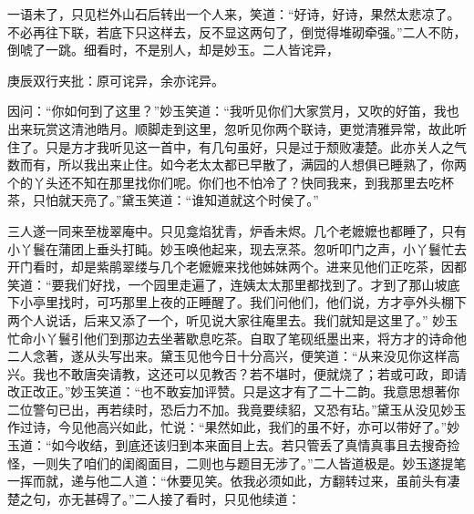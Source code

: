 \begin{parag}
    一语未了，只见栏外山石后转出一个人来，笑道：“好诗，好诗，果然太悲凉了。不必再往下联，若底下只这样去，反不显这两句了，倒觉得堆砌牵强。”二人不防，倒唬了一跳。细看时，不是别人，却是妙玉。二人皆诧异，\begin{note}庚辰双行夹批：原可诧异，余亦诧异。\end{note}因问：“你如何到了这里？”妙玉笑道：“我听见你们大家赏月，又吹的好笛，我也出来玩赏这清池皓月。顺脚走到这里，忽听见你两个联诗，更觉清雅异常，故此听住了。只是方才我听见这一首中，有几句虽好，只是过于颓败凄楚。此亦关人之气数而有，所以我出来止住。如今老太太都已早散了，满园的人想俱已睡熟了，你两个的丫头还不知在那里找你们呢。你们也不怕冷了？快同我来，到我那里去吃杯茶，只怕就天亮了。”黛玉笑道：“谁知道就这个时侯了。”
\end{parag}


\begin{parag}
    三人遂一同来至栊翠庵中。只见龛焰犹青，炉香未烬。几个老嬷嬷也都睡了，只有小丫鬟在蒲团上垂头打盹。妙玉唤他起来，现去烹茶。忽听叩门之声，小丫鬟忙去开门看时，却是紫鹃翠缕与几个老嬷嬷来找他姊妹两个。进来见他们正吃茶，因都笑道：“要我们好找，一个园里走遍了，连姨太太那里都找到了。才到了那山坡底下小亭里找时，可巧那里上夜的正睡醒了。我们问他们，他们说，方才亭外头棚下两个人说话，后来又添了一个，听见说大家往庵里去。我们就知是这里了。” 妙玉忙命小丫鬟引他们到那边去坐著歇息吃茶。自取了笔砚纸墨出来，将方才的诗命他二人念著，遂从头写出来。黛玉见他今日十分高兴，便笑道：“从来没见你这样高兴。我也不敢唐突请教，这还可以见教否？若不堪时，便就烧了；若或可政，即请改正改正。”妙玉笑道：“也不敢妄加评赞。只是这才有了二十二韵。我意思想著你二位警句已出，再若续时，恐后力不加。我竟要续貂，又恐有玷。”黛玉从没见妙玉作过诗，今见他高兴如此，忙说：“果然如此，我们的虽不好，亦可以带好了。”妙玉道：“如今收结，到底还该归到本来面目上去。若只管丢了真情真事且去搜奇捡怪，一则失了咱们的闺阁面目，二则也与题目无涉了。”二人皆道极是。妙玉遂提笔一挥而就，递与他二人道：“休要见笑。依我必须如此，方翻转过来，虽前头有凄楚之句，亦无甚碍了。”二人接了看时，只见他续道：
\end{parag}


